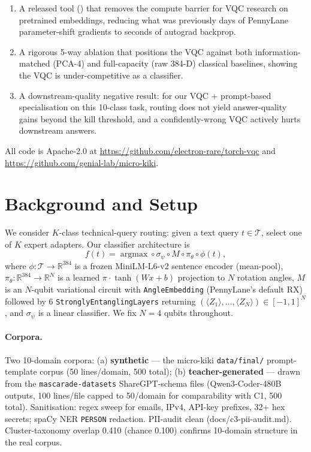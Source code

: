 \begin{enumerate}
\item A released tool (\torchvqc) that removes the compute barrier for VQC research on pretrained embeddings, reducing what was previously days of PennyLane parameter-shift gradients to seconds of autograd backprop.
\item A rigorous 5-way ablation that positions the VQC against both information-matched (PCA-4) and full-capacity (raw 384-D) classical baselines, showing the VQC is under-competitive as a classifier.
\item A downstream-quality negative result: for our VQC + prompt-based specialisation on this 10-class task, routing does not yield answer-quality gains beyond the kill threshold, and a confidently-wrong VQC actively hurts downstream answers.
\end{enumerate}

All code is Apache-2.0 at \url{https://github.com/electron-rare/torch-vqc} and \url{https://github.com/genial-lab/micro-kiki}.

\section{Background and Setup}\label{sec:setup}

We consider $K$-class technical-query routing: given a text query $t \in \mathcal{T}$, select one of $K$ expert adapters. Our classifier architecture is
\begin{equation}
f(t) = \mathop{\arg\max} \circ \sigma_\psi \circ M \circ \pi_\theta \circ \phi(t),
\end{equation}
where $\phi : \mathcal{T} \to \mathbb{R}^{384}$ is a frozen MiniLM-L6-v2 sentence encoder (mean-pool), $\pi_\theta : \mathbb{R}^{384} \to \mathbb{R}^N$ is a learned $\pi \cdot \tanh(Wx+b)$ projection to $N$ rotation angles, $M$ is an $N$-qubit variational circuit with \texttt{AngleEmbedding} (PennyLane's default RX) followed by 6 \texttt{StronglyEntanglingLayers} returning $(\langle Z_1 \rangle, \ldots, \langle Z_N \rangle) \in [-1,1]^N$, and $\sigma_\psi$ is a linear classifier. We fix $N = 4$ qubits throughout.

\paragraph{Corpora.} Two 10-domain corpora: (a) \textbf{synthetic} --- the micro-kiki \texttt{data/final/} prompt-template corpus (50 lines/domain, 500 total); (b) \textbf{teacher-generated} --- drawn from the \texttt{mascarade-datasets} ShareGPT-schema files (Qwen3-Coder-480B outputs, 100 lines/file capped to 50/domain for comparability with C1, 500 total). Sanitisation: regex sweep for emails, IPv4, API-key prefixes, 32+ hex secrets; spaCy NER \texttt{PERSON} redaction. PII-audit clean (docs/c3-pii-audit.md). Cluster-taxonomy overlap 0.410 (chance 0.100) confirms 10-domain structure in the real corpus.

